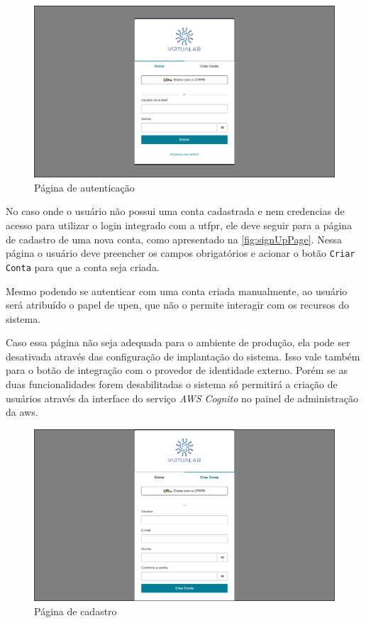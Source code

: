 \begin{figure}[H]
\caption{Página de autenticação}
\label{fig:signInPage}
\includegraphics[width=\textwidth]{capitulos/3-resultados/files/sign-in.png}
\end{figure}

No caso onde o usuário não possui uma conta cadastrada e nem credencias de acesso para utilizar o login integrado com a \gls{utfpr}, ele deve seguir para a página de cadastro de uma nova conta, como apresentado na \autoref{fig:signUpPage}. Nessa página o usuário deve preencher os campos obrigatórios e acionar o botão \texttt{Criar Conta}  para que a conta seja criada.

Mesmo podendo se autenticar com uma conta criada manualmente, ao usuário será atribuído o papel de \gls{upen}, que não o permite interagir com os recursos do sistema.

Caso essa página não seja adequada para o ambiente de produção, ela pode ser desativada através das configuração de implantação do sistema. Isso vale também para o botão de integração com o provedor de identidade externo. Porém se as duas funcionalidades forem desabilitadas o sistema só permitirá a criação de usuários através da interface do serviço \textit{AWS Cognito} no painel de administração da \gls{aws}.


\begin{figure}[H]
\caption{Página de cadastro}
\label{fig:signUpPage}
\includegraphics[width=\textwidth]{capitulos/3-resultados/files/sign-up.png}
\end{figure}

